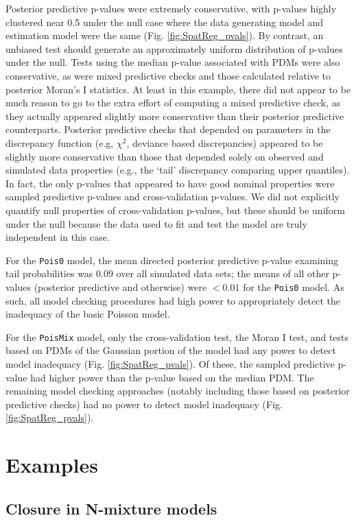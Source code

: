 \documentclass[12pt,english]{article}
\begin{document}
\begin{spacing}{1.9}
Posterior predictive p-values were extremely conservative, with
p-values highly clustered near 0.5 under the null case where the data
generating model and estimation model were the same
(Fig. \ref{fig:SpatReg_pvals}).  By contrast, an unbiased test should
generate an approximately uniform distribution of p-values under the
null.  Tests using the median p-value associated with PDMs were also
conservative, as were mixed predictive checks and those calculated
relative to posterior Moran's I statistics.  At least in this example,
there did not appear to be much reason to go to the extra effort of
computing a mixed predictive check, as they actually appeared slightly
more conservative than their posterior predictive counterparts.
Posterior predictive checks that depended on parameters in the
discrepancy function (e.g, $\chi^2$, deviance based discrepancies)
appeared to be slightly more conservative than those that depended
solely on observed and simulated data properties (e.g., the `tail'
discrepancy comparing upper quantiles).  In fact, the only p-values
that appeared to have good nominal properties were sampled predictive
p-values and cross-validation p-values.  We did not explicitly
quantify null properties of cross-validation p-values, but these
should be uniform under the null because the data used to fit and test
the model are truly independent in this case.

For the \texttt{Pois0} model, the mean directed posterior predictive
p-value examining tail probabilities was 0.09 over all simulated data
sets; the means of all other p-values (posterior predictive and
otherwise) were $<0.01$ for the \texttt{Pois0} model.  As such, all
model checking procedures had high power to appropriately detect the
inadequacy of the basic Poisson model.

For the \texttt{PoisMix} model, only the cross-validation test, the
Moran I test, and tests based on PDMs of the Gaussian portion of the
model had any power to detect model inadequacy
(Fig. \ref{fig:SpatReg_pvals}).  Of these, the sampled predictive
p-value had higher power than the p-value based on the median PDM.
The remaining model checking approaches (notably including those based
on posterior predictive checks) had no power to detect model
inadequacy (Fig. \ref{fig:SpatReg_pvals}).


\section{Examples}


\subsection*{Closure in N-mixture models}


\end{spacing}
\end{document}
